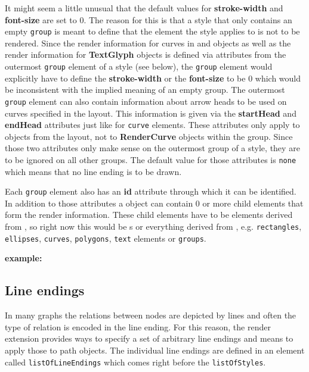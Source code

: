 It might seem a little unusual that the default values for \textbf{stroke-width} and
\textbf{font-size} are set to 0. The reason for this is that a style that only contains
an empty \texttt{group} is meant to define that the element the style applies to is not
to be rendered. Since the render information for curves in
\SpeciesReferenceGlyph and \ReactionGlyph objects as well as the render information for
\textbf{TextGlyph} objects is defined via attributes from the outermost \texttt{group} element of a
style (see below), the \texttt{group} element would explicitly have to define the \textbf{stroke-width} or the
\textbf{font-size} to be 0 which would be inconsistent with the implied meaning of an
empty group.
The outermost \texttt{group} element can also contain information about arrow heads to be used on curves 
specified in the layout. This information is given via the \textbf{startHead} and \textbf{endHead}
attributes just like for \texttt{curve} elements. These attributes only apply to \RenderCurve objects from the layout, not
to \textbf{RenderCurve} objects within the group. Since those two attributes only make sense on the outermost group of a style,
they are to be ignored on all other groups. The default value for those attributes is \texttt{none} which means that 
no line ending is to be drawn. 


Each \texttt{group} element also has an \textbf{id} attribute through which it can be identified. 
In addition to those attributes a \Group object can contain 0 or more child
elements that form the render information. These child elements have to be elements derived from \TransformationTwoD,
so right now this would be {\Image}s or everything derived from \GraphicalPrimitiveOneD,
e.g. \texttt{rectangles}, \texttt{ellipses}, \texttt{curves}, \texttt{polygons}, \texttt{text} elements
or \texttt{groups}.

{\large
{\bf
example:
}
}

{\footnotesize
{}
}

\subsection{Line endings}
\label{lineending-class}
In many graphs the relations between nodes are depicted by lines and often the 
type of relation is encoded in the line ending. For this reason, the render
extension provides ways to specify a set of arbitrary line endings and means to
apply those to path objects.
The individual line endings are defined in an element called
\texttt{listOfLineEndings} which comes right before the \texttt{listOf\-Styles}.

